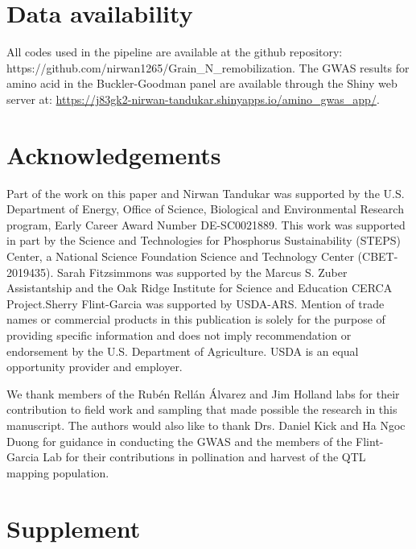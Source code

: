 \section{Data availability}
All codes used in the pipeline are available at the github repository: https://github.com/nirwan1265/Grain\_N\_remobilization. The GWAS results for amino acid in the Buckler-Goodman panel are available through the Shiny web server at:
\url{https://j83gk2-nirwan-tandukar.shinyapps.io/amino_gwas_app/}.


\section{Acknowledgements}

Part of the work on this paper and Nirwan Tandukar was supported by the U.S. Department of Energy, Office of Science, Biological and Environmental Research program, Early Career Award Number DE-SC0021889.
This work was supported in part by the Science and Technologies for Phosphorus Sustainability (STEPS) Center, a National Science Foundation Science and Technology Center (CBET-2019435). Sarah Fitzsimmons was supported by the Marcus S. Zuber Assistantship and the Oak Ridge Institute for Science and Education CERCA Project.Sherry Flint-Garcia was supported by USDA-ARS. Mention of trade names or commercial products in this publication is solely for the purpose of providing specific information and does not imply recommendation or endorsement by the U.S. Department of Agriculture. USDA is an equal opportunity provider and employer.

We thank members of the Rubén Rellán Álvarez and Jim Holland labs for their contribution to field work and sampling that made possible the research in this manuscript. The authors would also like to thank Drs. Daniel Kick and Ha Ngoc Duong for guidance in conducting the GWAS and the members of the Flint-Garcia Lab for their contributions in pollination and harvest of the QTL mapping population.




\pagebreak

\onecolumn


\section{Supplement}
\beginsupplement



